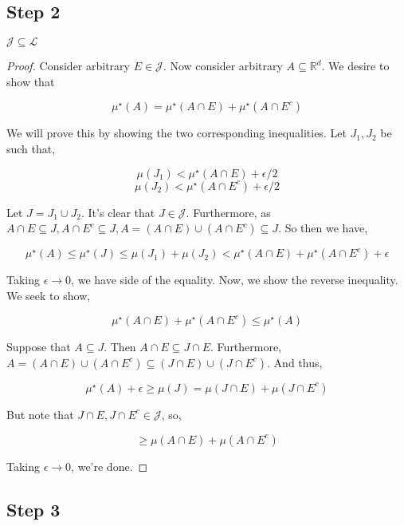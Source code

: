 \subsection{Step 2}

\begin{theorem}
   $\mathcal J \subseteq \mathcal L$
\end{theorem}

\begin{proof} 
   Consider arbitrary $E \in \mathcal J$. Now consider arbitrary $A \subseteq \mathbb R^d$. We desire 
   to show that 

   \[ \mu^\star(A) = \mu^\star(A \cap E) + \mu^\star(A \cap E^c) \]

   We will prove this by showing the two corresponding inequalities. Let 
   $J_1,J_2$ be such that, 

   \[ \mu(J_1) < \mu^\star(A \cap E) + \epsilon/2 \] 
   \[ \mu(J_2) < \mu^\star(A \cap E^c) + \epsilon/2 \] 

   Let $J = J_1 \cup J_2$. It's clear that
   $J \in \mathcal J$. Furthermore, as $A \cap E \subseteq J, A \cap E^c \subseteq J, 
   A = (A \cap E) \cup (A \cap E^c) \subseteq J$. So then we have,

   \[ \mu^\star(A) \leq \mu^\star(J) \leq \mu(J_1) + \mu(J_2) < \mu^\star(A \cap E) + \mu^\star(A \cap E^c) + \epsilon \]

   Taking $\epsilon \to 0$, we have side of the equality. 
   Now, we show the reverse inequality. We seek to show, 

   \[  \mu^\star(A \cap E) + \mu^\star(A \cap E^c) \leq \mu^\star(A) \]

   Suppose that $A \subseteq J$. Then $A \cap E \subseteq J \cap E$. Furthermore, 
   $A = (A \cap E) \cup (A \cap E^c) \subseteq (J \cap E) \cup (J \cap E^c)$. And thus, 

   \[ \mu^\star(A) + \epsilon \geq \mu(J) = \mu(J \cap E) + \mu(J \cap E^c) \]

   But note that $J \cap E, J \cap E^c \in \mathcal J$, so, 

   \[ \geq \mu(A \cap E) + \mu(A \cap E^c) \]

   Taking $\epsilon \to 0$, we're done.

\end{proof}

\subsection{Step 3}


